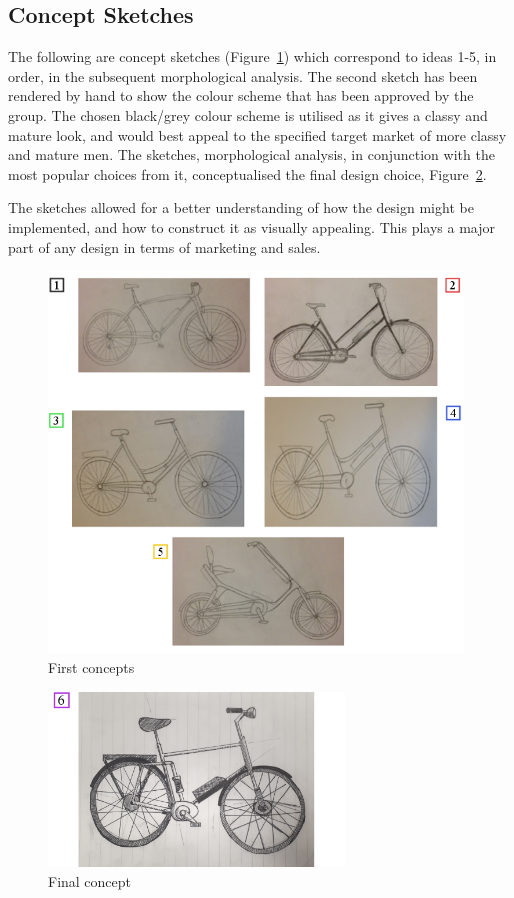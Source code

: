 \documentclass[a4paper,11pt]{article}
\begin{document}
\subsection{Concept Sketches}

The following are concept sketches (Figure~\ref{fig:sk}) which correspond to ideas 1-5, in order, in the subsequent morphological analysis. The second sketch has been rendered by hand to show the colour scheme that has been approved by the group. The chosen black/grey colour scheme is utilised as it gives a classy and mature look, and would best appeal to the specified target market of more classy and mature men. The sketches, morphological analysis, in conjunction with the most popular choices from it, conceptualised the final design choice, Figure~\ref{fig:fs}. 

The sketches allowed for a better understanding of how the design might be implemented, and how to construct it as visually appealing. This plays a major part of any design in terms of marketing and sales. 

\begin{figure}[!ht]
	\centering
	\includegraphics[width=0.98\textwidth]{ske}
	\caption{First concepts}
	\label{fig:sk}
\end{figure}

\begin{figure}[!ht]
	\centering
	\includegraphics[width=0.7\textwidth]{fic}
	\caption{Final concept}
	\label{fig:fs}
\end{figure}
\end{document}
